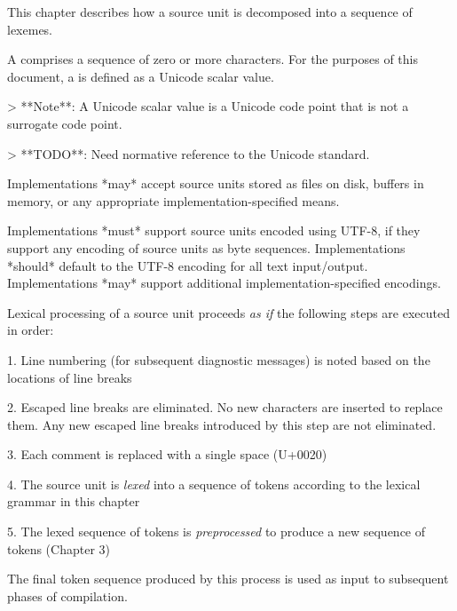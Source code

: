 
This chapter describes how a source unit is decomposed into a sequence of lexemes.


A  comprises a sequence of zero or more characters.
For the purposes of this document, a  is defined as a Unicode scalar value.

> **Note**: A Unicode scalar value is a Unicode code point that is not a surrogate code point.

> **TODO**: Need normative reference to the Unicode standard.

Implementations *may* accept source units stored as files on disk, buffers in memory, or any appropriate implementation-specified means.


Implementations *must* support source units encoded using UTF-8, if they support any encoding of source units as byte sequences.
Implementations *should* default to the UTF-8 encoding for all text input/output.
Implementations *may* support additional implementation-specified encodings.


Lexical processing of a source unit proceeds \emph{as if} the following steps are executed in order:

1. Line numbering (for subsequent diagnostic messages) is noted based on the locations of line breaks

2. Escaped line breaks are eliminated. No new characters are inserted to replace them. Any new escaped line breaks introduced by this step are not eliminated.

3. Each comment is replaced with a single space (U+0020)

4. The source unit is \emph{lexed} into a sequence of tokens according to the lexical grammar in this chapter

5. The lexed sequence of tokens is \emph{preprocessed} to produce a new sequence of tokens (Chapter 3)

The final token sequence produced by this process is used as input to subsequent phases of compilation.


\begin{Lexical}
     \\
         \\
    \SynOr {}
\end{Lexical}

